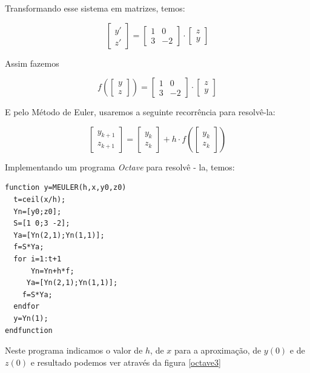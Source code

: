 \documentclass[11pt, openright, a4paper, brazil, openany, oneside]{abntex2}
\begin{document}
Transformando esse sistema em matrizes, temos:

$$
\left[ \begin{array}{c}
y'\\
z'
\end{array} \right] =
\left[\begin{array}{cc}
1 & 0\\
3 & -2
\end{array}\right]\cdot
\left[\begin{array}{c}
z\\
y
\end{array}\right]
$$

Assim fazemos

$$
f\left(\left[ \begin{array}{c}
y\\
z
\end{array} \right]\right) =
\left[\begin{array}{cc}
1 & 0\\
3 & -2
\end{array}\right]\cdot
\left[\begin{array}{c}
z\\
y
\end{array}\right]
$$

E pelo Método de Euler, usaremos a seguinte recorrência para resolvê-la:

$$
\left[
\begin{array}{c}
y_{k+1}\\
z_{k+1}

\end{array}\right] =
\left[
\begin{array}{c}
y_{k}\\
z_{k}
\end{array}\right] + h\cdot
f\left(\left[
\begin{array}{c}
y_{k}\\
z_{k}
\end{array}\right]\right)
$$

\newpage

Implementando um programa \textit{Octave} para resolvê - la, temos:

\begin{verbatim}
function y=MEULER(h,x,y0,z0)
  t=ceil(x/h);
  Yn=[y0;z0];
  S=[1 0;3 -2];
  Ya=[Yn(2,1);Yn(1,1)];
  f=S*Ya;
  for i=1:t+1
      Yn=Yn+h*f;
     Ya=[Yn(2,1);Yn(1,1)];
    f=S*Ya;
  endfor
  y=Yn(1);
endfunction
\end{verbatim}

Neste programa indicamos o valor de $h$, de $x$ para a aproximação, de $y(0)$ e de $z(0)$ e resultado podemos ver através da figura \ref{octave3}
\end{document}
